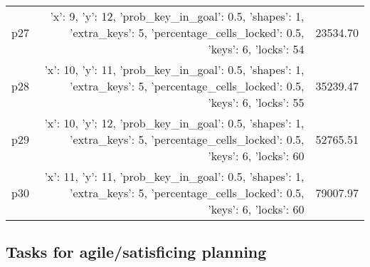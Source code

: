 \documentclass{article}
\begin{document}
\begin{center}
\begin{tabular}{@{}l|r|r@{}}
  p27&{'x': 9, 'y': 12, 'prob\_key\_in\_goal': 0.5, 'shapes': 1, 'extra\_keys': 5, 'percentage\_cells\_locked': 0.5, 'keys': 6, 'locks': 54}&23534.70\\
  p28&{'x': 10, 'y': 11, 'prob\_key\_in\_goal': 0.5, 'shapes': 1, 'extra\_keys': 5, 'percentage\_cells\_locked': 0.5, 'keys': 6, 'locks': 55}&35239.47\\
  p29&{'x': 10, 'y': 12, 'prob\_key\_in\_goal': 0.5, 'shapes': 1, 'extra\_keys': 5, 'percentage\_cells\_locked': 0.5, 'keys': 6, 'locks': 60}&52765.51\\
  p30&{'x': 11, 'y': 11, 'prob\_key\_in\_goal': 0.5, 'shapes': 1, 'extra\_keys': 5, 'percentage\_cells\_locked': 0.5, 'keys': 6, 'locks': 60}&79007.97
                            \end{tabular}
                            \end{center}
                    

                                \subsection*{Tasks for agile/satisficing planning}
                                
\end{document}
